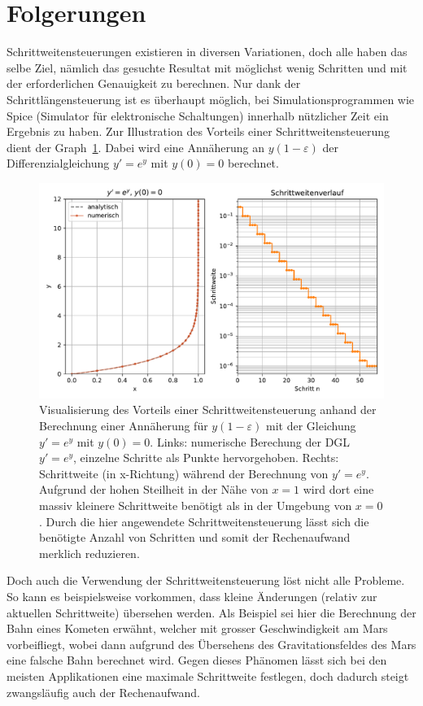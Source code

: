 %
%
%
\section{Folgerungen
\label{steps:section:folgerungen}}
Schrittweitensteuerungen existieren in diversen Variationen, doch alle haben das selbe Ziel, nämlich
das gesuchte Resultat mit möglichst wenig Schritten und mit der erforderlichen Genauigkeit zu berechnen.
Nur dank der Schrittlängensteuerung ist es überhaupt möglich, bei Simulationsprogrammen wie Spice (Simulator für elektronische Schaltungen)
innerhalb nützlicher Zeit ein Ergebnis zu haben. Zur Illustration des Vorteils einer Schrittweitensteuerung dient der Graph~\ref{buch:steps:beispielfuerssc}.
Dabei wird eine Annäherung an $y(1-\varepsilon)$ der Differenzialgleichung $y'=e^y$ mit $y(0)=0$ berechnet.

\begin{figure}
    \centering
    \includegraphics[width=\textwidth]{papers/steps/img/example_for_ssc.pdf}
    \caption{Visualisierung des Vorteils einer Schrittweitensteuerung anhand der Berechnung einer Annäherung für
    $y(1-\varepsilon)$ mit der Gleichung $y'=e^y$ mit $y(0)=0$.
    Links: numerische Berechung der DGL $y'=e^y$, einzelne Schritte als Punkte hervorgehoben.
    Rechts: Schrittweite (in x-Richtung) während der Berechnung von $y'=e^y$.
    Aufgrund der hohen Steilheit in der Nähe von $x=1$ wird dort eine massiv kleinere Schrittweite benötigt
    als in der Umgebung von $x=0$. Durch die hier angewendete Schrittweitensteuerung lässt sich die benötigte
    Anzahl von Schritten und somit der Rechenaufwand merklich reduzieren.
    \label{buch:steps:beispielfuerssc}}
\end{figure}

Doch auch die Verwendung der Schrittweitensteuerung löst nicht alle Probleme.
So kann es beispielsweise vorkommen, dass kleine Änderungen (relativ zur aktuellen Schrittweite) übersehen werden.
Als Beispiel sei hier die Berechnung der Bahn eines Kometen erwähnt, welcher mit grosser Geschwindigkeit am Mars vorbeifliegt,
wobei dann aufgrund des Übersehens des Gravitationsfeldes des Mars eine falsche Bahn berechnet wird.
Gegen dieses Phänomen lässt sich bei den meisten Applikationen eine maximale Schrittweite festlegen,
doch dadurch steigt zwangsläufig auch der Rechenaufwand.

